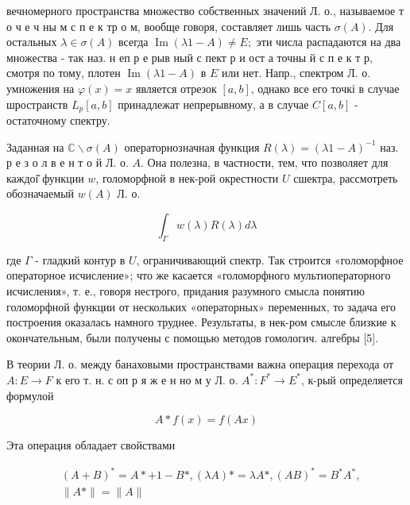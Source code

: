 \documentclass[10pt]{article}
\begin{document}
вечномерного пространства множество собственных значений Л. о., называемое т о ч е ч ны м с п е к тр о м, вообще говоря, составляет лишь часть $\sigma(A)$. Для остальных $\lambda \in \sigma(A)$ всегда $\operatorname{Im}(\lambda 1-A) \neq E ;$ эти числа распадаются на два множества - так наз. н еп р е рыв ный с пект р и ост а точны й с п е к т р, смотря по тому, плотен $\operatorname{Im}(\lambda 1-A)$ в $E$ или нет. Напр., спектром Л. о. умножения на $\varphi(x)=x$ является отрезок $[a, b]$, однако все его точкі в случае шространств $L_{p}[a, b]$ принадлежат непрерывному, а в случае $C[a, b]$ - остаточному спектру.



Заданная на $\mathbb{C} \backslash \sigma(A)$ операторнозначная функция $R(\lambda)=(\lambda 1-A)^{-1}$ наз. р е з о л в е н т о й Л. о. $A$. Она полезна, в частности, тем, что позволяет для каждоі̆ функции $w$, голоморфной в нек-рой окрестности $U$ сшектра, рассмотреть обозначаемый $w(A)$ Л. о.



\[

\int_{\Gamma} w(\lambda) R(\lambda) d \lambda

\]



где $\Gamma$ - гладкий контур в $U$, ограничивающий спектр. Так строится «голоморфное операторное исчисление»; что же касается «голоморфного мультиоператорного исчисления», т. е., говоря нестрого, придания разумного смысла понятию голоморфной функции от нескольких «операторных» переменных, то задача его построения оказалась намного труднее. Результаты, в нек-ром смысле близкие к окончательным, были получены с помощью методов гомологич. алгебры [5].



В теории Л. о. между банаховыми пространствами важна операция перехода от $A: E \rightarrow F$ к его т. н. с оп р я ж е н но м у Л. о. $A^{*}: F^{*} \rightarrow E^{*}$, к-рый определяется формулой



\[

A * f(x)=f(A x)

\]



Эта операция обладает свойствами



\[

\begin{aligned}

& (A+B)^{*}=A *+1-B *,(\lambda A) *=\lambda A *,(A B)^{*}=B^{*} A^{*}, \\

& \|A *\|=\|A\|

\end{aligned}

\]
\end{document}
